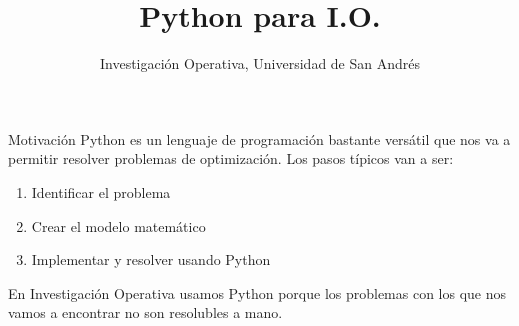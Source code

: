 \documentclass{beamer}
\title{\Huge\textbf{Python para I.O.}}
\author{Investigación Operativa, Universidad de San Andrés}
\date{}
\begin{document}
\begin{frame}
  \titlepage
\end{frame}

\begin{frame}{Motivación}
Python es un lenguaje de programación bastante versátil que nos va a permitir resolver problemas de optimización. Los pasos típicos van a ser:

\begin{enumerate}
    \item Identificar el problema
    \item Crear el modelo matemático
    \item Implementar y resolver usando Python
\end{enumerate}

\vspace{0.3cm}
En Investigación Operativa usamos Python porque los problemas con los que nos vamos a encontrar no son resolubles a mano.
\end{frame}
\end{document}
